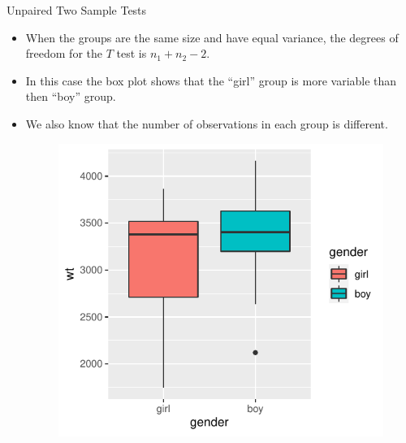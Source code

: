 \documentclass[handout]{beamer}
\begin{document}
\begin{frame}{Unpaired Two Sample Tests}
 \scriptsize{

\begin{itemize}
 
 \item When the groups are the same size and have equal variance, the degrees of freedom for the $T$ test is  $n_1+n_2-2$.
 
  \item In this case the box plot shows that the ``girl'' group is more variable than then ``boy'' group.
  
  \item We also know that the number of observations in each group is different.
 
 
  \begin{figure}[h!]
	\centering
	\includegraphics[scale=0.55]{pics/boxplotgender.pdf}
\end{figure}

 
\end{itemize}



}
\end{frame}
\end{document}
